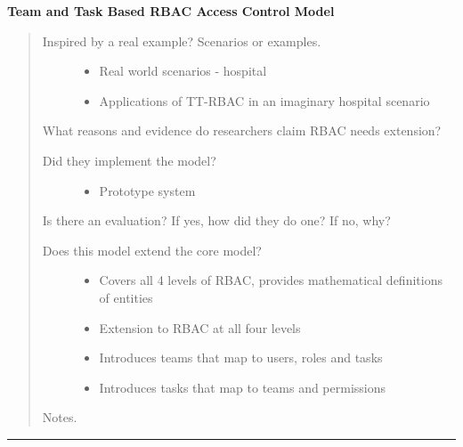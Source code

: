 \documentclass[letterpaper,10pt,english]{sphinxmanual}
\begin{document}
\textbf{Team and Task Based RBAC Access Control Model}
\begin{quote}
\begin{description}
\item[{Inspired by a real example? Scenarios or examples.}] \leavevmode\begin{itemize}
\item {} 
Real world scenarios - hospital

\item {} 
Applications of TT-RBAC in an imaginary hospital scenario

\end{itemize}

\end{description}

What reasons and evidence do researchers claim RBAC needs extension?
\begin{description}
\item[{Did they implement the model?}] \leavevmode\begin{itemize}
\item {} 
Prototype system

\end{itemize}

\end{description}

Is there an evaluation? If yes, how did they do one? If no, why?
\begin{description}
\item[{Does this model extend the core model?}] \leavevmode\begin{itemize}
\item {} 
Covers all 4 levels of RBAC, provides mathematical definitions of entities

\item {} 
Extension to RBAC at all four levels

\item {} 
Introduces teams that map to users, roles and tasks

\item {} 
Introduces tasks that map to teams and permissions

\end{itemize}

\end{description}

Notes.
\end{quote}


\bigskip\hrule{}\bigskip
\end{document}
